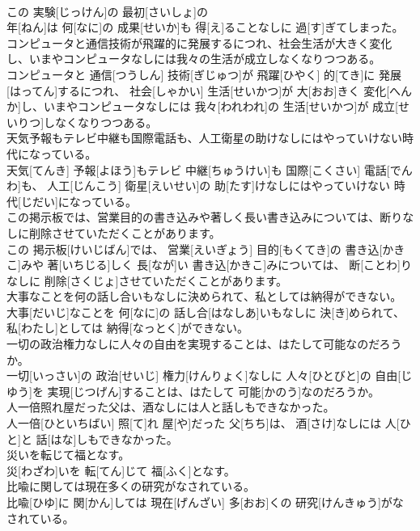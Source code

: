 \documentclass[8pt]{extreport}
\begin{document}
\begin{CJK}{UTF8}{min}
\\	この 実験[じっけん]の 最初[さいしょ]の 
\\	年[ねん]は 何[なに]の 成果[せいか]も 得[え]ることなしに 過[す]ぎてしまった。
\\	コンピュータと通信技術が飛躍的に発展するにつれ、社会生活が大きく変化し、いまやコンピュータなしには我々の生活が成立しなくなりつつある。	
\\	コンピュータと 通信[つうしん] 技術[ぎじゅつ]が 飛躍[ひやく] 的[てき]に 発展[はってん]するにつれ、 社会[しゃかい] 生活[せいかつ]が 大[おお]きく 変化[へんか]し、いまやコンピュータなしには 我々[われわれ]の 生活[せいかつ]が 成立[せいりつ]しなくなりつつある。
\\	天気予報もテレビ中継も国際電話も、人工衛星の助けなしにはやっていけない時代になっている。	
\\	天気[てんき] 予報[よほう]もテレビ 中継[ちゅうけい]も 国際[こくさい] 電話[でんわ]も、 人工[じんこう] 衛星[えいせい]の 助[たす]けなしにはやっていけない 時代[じだい]になっている。
\\	この掲示板では、営業目的の書き込みや著しく長い書き込みについては、断りなしに削除させていただくことがあります。	
\\	この 掲示板[けいじばん]では、 営業[えいぎょう] 目的[もくてき]の 書き込[かきこ]みや 著[いちじる]しく 長[なが]い 書き込[かきこ]みについては、 断[ことわ]りなしに 削除[さくじょ]させていただくことがあります。
\\	大事なことを何の話し合いもなしに決められて、私としては納得ができない。	
\\	大事[だいじ]なことを 何[なに]の 話し合[はなしあ]いもなしに 決[き]められて、 私[わたし]としては 納得[なっとく]ができない。
\\	一切の政治権力なしに人々の自由を実現することは、はたして可能なのだろうか。	
\\	一切[いっさい]の 政治[せいじ] 権力[けんりょく]なしに 人々[ひとびと]の 自由[じゆう]を 実現[じつげん]することは、はたして 可能[かのう]なのだろうか。
\\	人一倍照れ屋だった父は、酒なしには人と話しもできなかった。	
\\	人一倍[ひといちばい] 照[て]れ 屋[や]だった 父[ちち]は、 酒[さけ]なしには 人[ひと]と 話[はな]しもできなかった。
\\	災いを転じて福となす。	
\\	災[わざわ]いを 転[てん]じて 福[ふく]となす。
\\	比喩に関しては現在多くの研究がなされている。	
\\	比喩[ひゆ]に 関[かん]しては 現在[げんざい] 多[おお]くの 研究[けんきゅう]がなされている。

\end{CJK}
\end{document}
